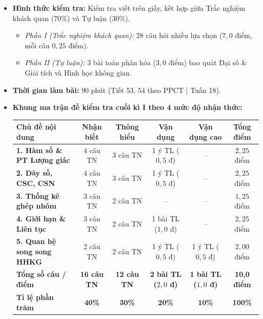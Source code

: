 \documentclass[12pt, a4paper]{article}
\begin{document}
\begin{itemize}[leftmargin=1.2cm]
    \item \textbf{Hình thức kiểm tra:} Kiểm tra viết trên giấy, kết hợp giữa Trắc nghiệm khách quan ($70\%$) và Tự luận ($30\%$).
    \begin{itemize}[leftmargin=0.6cm]
        \item \textit{Phần I (Trắc nghiệm khách quan):} $28$ câu hỏi nhiều lựa chọn ($7{,}0$ điểm, mỗi câu $0{,}25$ điểm).
        \item \textit{Phần II (Tự luận):} $3$ bài toán phân hóa ($3{,}0$ điểm) bao quát Đại số \& Giải tích và Hình học không gian.
    \end{itemize}
    \item \textbf{Thời gian làm bài:} $90$ phút (Tiết 53, 54 theo PPCT | Tuần 18).
    \item \textbf{Khung ma trận đề kiểm tra cuối kì I theo 4 mức độ nhận thức:}
    \begin{center}
    \begin{tabularx}{\textwidth}{|p{4.2cm}|c|c|c|c|c|}
    \hline
    \textbf{Chủ đề nội dung} & \textbf{Nhận biết} & \textbf{Thông hiểu} & \textbf{Vận dụng} & \textbf{Vận dụng cao} & \textbf{Tổng điểm} \\ \hline
    \textbf{1. Hàm số \& PT Lượng giác} & 4 câu TN & 3 câu TN & 1 ý TL ($0{,}5$ đ) & -- & $2{,}25$ điểm \\ \hline
    \textbf{2. Dãy số, CSC, CSN} & 4 câu TN & 3 câu TN & 1 ý TL ($0{,}5$ đ) & -- & $2{,}25$ điểm \\ \hline
    \textbf{3. Thống kê ghép nhóm} & 3 câu TN & 2 câu TN & -- & -- & $1{,}25$ điểm \\ \hline
    \textbf{4. Giới hạn \& Liên tục} & 3 câu TN & 2 câu TN & 1 bài TL ($1{,}0$ đ) & -- & $2{,}25$ điểm \\ \hline
    \textbf{5. Quan hệ song song HHKG} & 2 câu TN & 2 câu TN & 1 ý TL ($0{,}5$ đ) & 1 ý TL ($0{,}5$ đ) & $2{,}00$ điểm \\ \hline
    \textbf{Tổng số câu / điểm} & \textbf{16 câu TN} & \textbf{12 câu TN} & \textbf{2 bài TL ($2{,}0$ đ)} & \textbf{1 bài TL ($1{,}0$ đ)} & \textbf{10,0 điểm} \\ \hline
    \textbf{Tỉ lệ phần trăm} & \textbf{40\%} & \textbf{30\%} & \textbf{20\%} & \textbf{10\%} & \textbf{100\%} \\ \hline
    \end{tabularx}
    \end{center}
\end{itemize}
\end{document}
